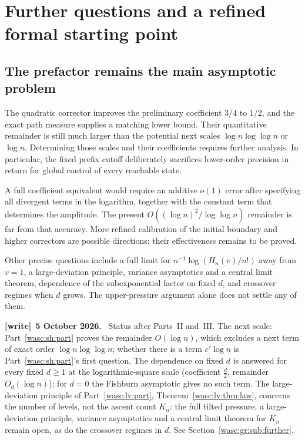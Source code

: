 \documentclass[11pt,a4paper]{article}
\theoremstyle{remark}\newtheorem{remark}[theorem]{Remark}
\numberwithin{equation}{section}
\newenvironment{writenote}[1][]{\par\smallskip\begingroup\small
 \noindent\textbf{[write]}\if\relax\detokenize{#1}\relax\else~\textbf{#1.}\fi\ }%
 {\par\endgroup\smallskip}
\begin{document}
\section{Further questions and a refined formal starting point}\label{wasc:gr:sec:questions}
\subsection{The prefactor remains the main asymptotic problem}
The quadratic corrector improves the preliminary coefficient $3/4$ to $1/2$, and the exact path measure supplies a matching lower bound. Their quantitative remainder is still much larger than the potential next scales $\log n\log\log n$ or $\log n$. Determining those scales and their coefficients requires further analysis. In particular, the fixed prefix cutoff deliberately sacrifices lower-order precision in return for global control of every reachable state.

A full coefficient equivalent would require an additive $o(1)$ error after specifying all divergent terms in the logarithm, together with the constant term that determines the amplitude. The present $O((\log n)^2/\log\log n)$ remainder is far from that accuracy. More refined calibration of the initial boundary and higher correctors are possible directions; their effectiveness remains to be proved.

Other precise questions include a full limit for $n^{-1}\log(H_n(v)/n!)$ away from $v=1$, a large-deviation principle, variance asymptotics and a central limit theorem, dependence of the subexponential factor on fixed $d$, and crossover regimes when $d$ grows. The upper-pressure argument alone does not settle any of them.
\begin{writenote}[5 October 2026]
Status after Parts~II and~III. The next scale: Part~\ref{wasc:sh:part} proves the remainder $O(\log n)$, which excludes a next term of exact order $\log n\log\log n$; whether there is a term $c'\log n$ is Part~\ref{wasc:sh:part}'s first question. The dependence on fixed $d$ is answered for every fixed $d\ge1$ at the logarithmic-square scale (coefficient $\frac d2$, remainder $O_d(\log n)$); for $d=0$ the Fishburn asymptotic gives no such term. The large-deviation principle of Part~\ref{wasc:lv:part}, Theorem~\ref{wasc:lv:thm:law}, concerns the number of levels, not the ascent count $K_n$: the full tilted pressure, a large-deviation principle, variance asymptotics and a central limit theorem for $K_n$ remain open, as do the crossover regimes in $d$. See Section~\ref{wasc:gr:sub:further}.
\end{writenote}
\end{document}
